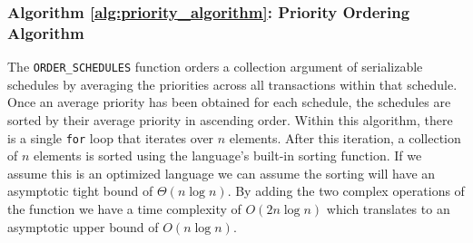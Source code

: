 \documentclass[conference]{IEEEtran}
\begin{document}

\subsubsection{Algorithm \ref{alg:priority_algorithm}: Priority Ordering Algorithm}
\label{alg_complexity:order_alg}
The \verb|ORDER_SCHEDULES| function orders a collection argument of serializable schedules by averaging the priorities across all transactions within that schedule. Once an average priority has been obtained for each schedule, the schedules are sorted by their average priority in ascending order. Within this algorithm, there is a single \verb|for| loop that iterates over $n$ elements. After this iteration, a collection of $n$ elements is sorted using the language's built-in sorting function. If we assume this is an optimized language we can assume the sorting will have an asymptotic tight bound of $\Theta(n\log n)$. By adding the two complex operations of the function we have a time complexity of $O(2n\log n)$ which translates to an asymptotic upper bound of $O(n\log n)$.
\end{document}
